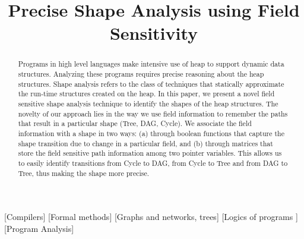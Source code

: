 \documentclass{sig-alternate}
\newcommand{\hide}[1]{} %
\begin{document}
%

\title{Precise Shape Analysis using Field Sensitivity}
\hide{author information}

\maketitle
\begin{abstract}
Programs in high level languages make intensive use of heap
to support dynamic data structures.  Analyzing these programs
requires precise reasoning about the heap structures. Shape
analysis refers to the class of techniques that statically
approximate the run-time structures created on the heap.  In
this paper, we present a novel field sensitive shape analysis
technique to identify the shapes of the heap structures.  The
novelty of our approach lies in the way we use field
information to remember the paths that result in a particular
shape (Tree, DAG, Cycle).  We associate the field information
with a shape in two ways: (a) through boolean functions that
capture the shape transition due to change in a particular
field, and (b) through matrices that store the field
sensitive path information among two pointer variables.  This
allows us to easily identify transitions from Cycle to DAG,
from Cycle to Tree and from DAG to Tree, thus making the
shape more precise.
\end{abstract}

[Compilers]
[Formal methods]
[Graphs and networks, trees]
[Logics of programs ]
[Program Analysis]
\end{document}
